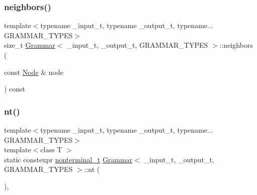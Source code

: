\mbox{\label{class_grammar_a7026d07264c64f85f370b01b19622415}} 
\subsubsection{\texorpdfstring{neighbors()}{neighbors()}}
{\footnotesize\ttfamily template$<$typename \+\_\+input\+\_\+t, typename \+\_\+output\+\_\+t, typename... G\+R\+A\+M\+M\+A\+R\+\_\+\+T\+Y\+P\+ES$>$ \\
size\+\_\+t \hyperlink{class_grammar}{Grammar}$<$ \+\_\+input\+\_\+t, \+\_\+output\+\_\+t, G\+R\+A\+M\+M\+A\+R\+\_\+\+T\+Y\+P\+ES $>$\+::neighbors (\begin{DoxyParamCaption}\item[{const \hyperlink{class_node}{Node} \&}]{node }\end{DoxyParamCaption}) const\hspace{0.3cm}{\ttfamily [inline]}}

\mbox{\label{class_grammar_ac7ec043aec5203a2cfac44f9cec50132}} 
\subsubsection{\texorpdfstring{nt()}{nt()}}
{\footnotesize\ttfamily template$<$typename \+\_\+input\+\_\+t, typename \+\_\+output\+\_\+t, typename... G\+R\+A\+M\+M\+A\+R\+\_\+\+T\+Y\+P\+ES$>$ \\
template$<$class T $>$ \\
static constexpr \hyperlink{_nonterminal_8h_a1c5bfe9b903f69c83bbde5da7035fef3}{nonterminal\+\_\+t} \hyperlink{class_grammar}{Grammar}$<$ \+\_\+input\+\_\+t, \+\_\+output\+\_\+t, G\+R\+A\+M\+M\+A\+R\+\_\+\+T\+Y\+P\+ES $>$\+::nt (\begin{DoxyParamCaption}{ }\end{DoxyParamCaption})\hspace{0.3cm}{\ttfamily [inline]}, {\ttfamily [static]}}

\mbox{\label{class_grammar_a52be4a9de3a90db8034ede12c344e241}} 
